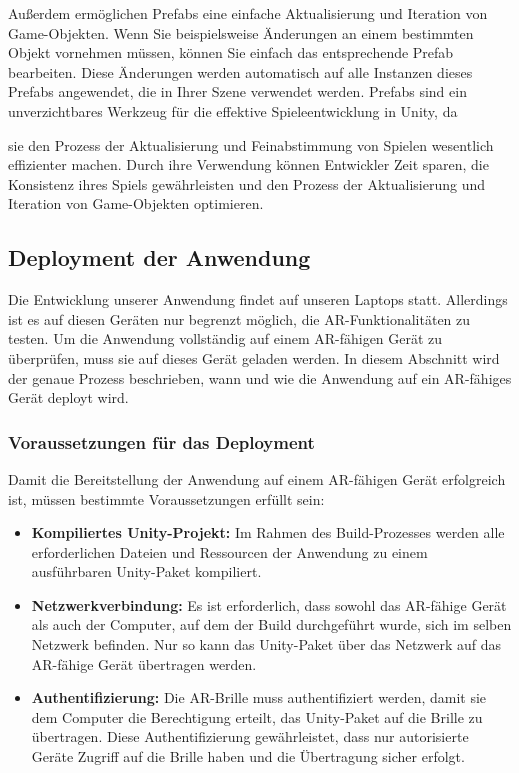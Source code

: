 Außerdem ermöglichen Prefabs eine einfache Aktualisierung und Iteration von Game-Objekten. Wenn Sie beispielsweise
Änderungen an einem bestimmten Objekt vornehmen müssen, können Sie einfach das entsprechende Prefab bearbeiten. Diese
Änderungen werden automatisch auf alle Instanzen dieses Prefabs angewendet, die in Ihrer Szene verwendet werden. Prefabs
sind ein unverzichtbares Werkzeug für die effektive Spieleentwicklung in Unity, da

sie den Prozess der Aktualisierung und Feinabstimmung von Spielen wesentlich effizienter machen. Durch ihre Verwendung
können Entwickler Zeit sparen, die Konsistenz ihres Spiels gewährleisten und den Prozess der Aktualisierung und Iteration
von Game-Objekten optimieren.

\subsection{Deployment der Anwendung} 

Die Entwicklung unserer Anwendung findet auf unseren Laptops statt. Allerdings ist es auf diesen Geräten nur begrenzt
möglich, die AR-Funktionalitäten zu testen. Um die Anwendung vollständig auf einem AR-fähigen Gerät zu überprüfen, muss
sie auf dieses Gerät geladen werden. In diesem Abschnitt wird der genaue Prozess beschrieben, wann und wie die Anwendung
auf ein AR-fähiges Gerät deployt wird.

\subsubsection{Voraussetzungen für das Deployment}

Damit die Bereitstellung der Anwendung auf einem AR-fähigen Gerät erfolgreich ist, müssen bestimmte Voraussetzungen erfüllt sein:

\begin{itemize}
    \item \textbf{Kompiliertes Unity-Projekt:} Im Rahmen des Build-Prozesses werden alle erforderlichen Dateien und
    Ressourcen der Anwendung zu einem ausführbaren Unity-Paket kompiliert.

    \item \textbf{Netzwerkverbindung:} Es ist erforderlich, dass sowohl das AR-fähige Gerät als auch der Computer, auf
    dem der Build durchgeführt wurde, sich im selben Netzwerk befinden. Nur so kann das Unity-Paket über das Netzwerk
    auf das AR-fähige Gerät übertragen werden.

    \item \textbf{Authentifizierung:} Die AR-Brille muss authentifiziert werden, damit sie dem Computer die Berechtigung
    erteilt, das Unity-Paket auf die Brille zu übertragen. Diese Authentifizierung gewährleistet, dass nur autorisierte
    Geräte Zugriff auf die Brille haben und die Übertragung sicher erfolgt.

\end{itemize}

